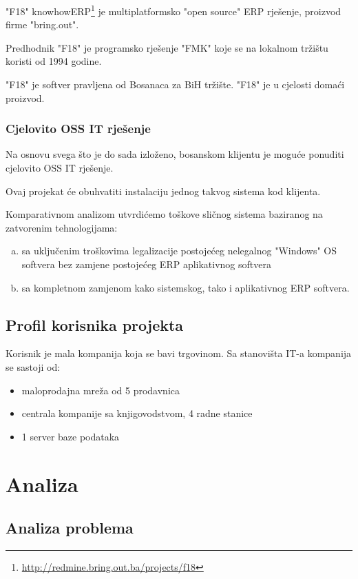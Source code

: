 \documentclass[times, utf8, seminar]{fit}
\begin{document}
"F18" knowhowERP\footnote{\url{http://redmine.bring.out.ba/projects/f18}} je multiplatformsko "open source" ERP rješenje, proizvod firme "bring.out".  

Predhodnik "F18" je programsko rješenje "FMK" koje se na lokalnom tržištu koristi od 1994 godine.

"F18" je softver pravljena od Bosanaca za BiH tržište. "F18" je u cjelosti domaći proizvod.

\subsection{Cjelovito OSS IT rješenje}
Na osnovu svega što je do sada izloženo, bosanskom klijentu je moguće ponuditi cjelovito OSS IT rješenje.  

Ovaj projekat će obuhvatiti instalaciju jednog takvog sistema kod klijenta.

Komparativnom analizom utvrdićemo toškove sličnog sistema baziranog na zatvorenim tehnologijama:
\begin{enumerate}[(a)]
  \item sa uključenim troškovima legalizacije postojećeg nelegalnog "Windows" OS softvera bez zamjene postojećeg ERP aplikativnog softvera
  \item sa kompletnom zamjenom kako sistemskog, tako i aplikativnog ERP softvera.  
\end{enumerate}

\section{Profil korisnika projekta}
Korisnik je mala kompanija koja se bavi trgovinom. Sa stanovišta IT-a kompanija se sastoji od:
\begin{itemize}
  \item maloprodajna mreža od 5 prodavnica
  \item centrala kompanije sa knjigovodstvom, 4 radne stanice
  \item 1 server baze podataka 
\end{itemize}

\chapter{Analiza}

\section{Analiza problema}
\end{document}
